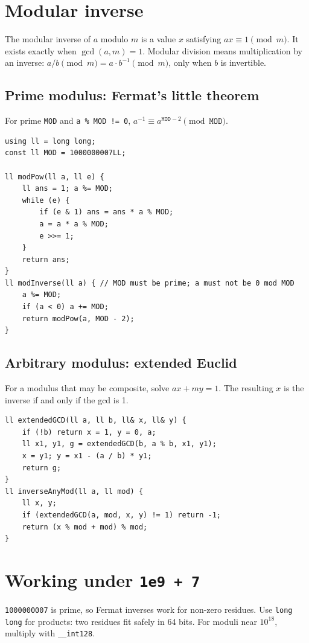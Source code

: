 \section{Modular inverse}

The modular inverse of $a$ modulo $m$ is a value $x$ satisfying $ax \equiv 1 \pmod m$. It exists exactly when $\gcd(a,m)=1$. Modular division means multiplication by an inverse: $a/b \pmod m = a \cdot b^{-1} \pmod m$, only when $b$ is invertible.

\subsection{Prime modulus: Fermat's little theorem}
For prime \texttt{MOD} and \texttt{a \% MOD != 0}, $a^{-1} \equiv a^{\texttt{MOD}-2} \pmod{\texttt{MOD}}$.

\begin{lstlisting}
using ll = long long;
const ll MOD = 1000000007LL;

ll modPow(ll a, ll e) {
    ll ans = 1; a %= MOD;
    while (e) {
        if (e & 1) ans = ans * a % MOD;
        a = a * a % MOD;
        e >>= 1;
    }
    return ans;
}
ll modInverse(ll a) { // MOD must be prime; a must not be 0 mod MOD
    a %= MOD;
    if (a < 0) a += MOD;
    return modPow(a, MOD - 2);
}
\end{lstlisting}

\subsection{Arbitrary modulus: extended Euclid}
For a modulus that may be composite, solve $ax+my=1$. The resulting $x$ is the inverse if and only if the gcd is 1.

\begin{lstlisting}
ll extendedGCD(ll a, ll b, ll& x, ll& y) {
    if (!b) return x = 1, y = 0, a;
    ll x1, y1, g = extendedGCD(b, a % b, x1, y1);
    x = y1; y = x1 - (a / b) * y1;
    return g;
}
ll inverseAnyMod(ll a, ll mod) {
    ll x, y;
    if (extendedGCD(a, mod, x, y) != 1) return -1;
    return (x % mod + mod) % mod;
}
\end{lstlisting}

\section{Working under \texttt{1e9 + 7}}

\texttt{1000000007} is prime, so Fermat inverses work for non-zero residues. Use \texttt{long long} for products: two residues fit safely in 64 bits. For moduli near $10^{18}$, multiply with \texttt{\_\_int128}.

